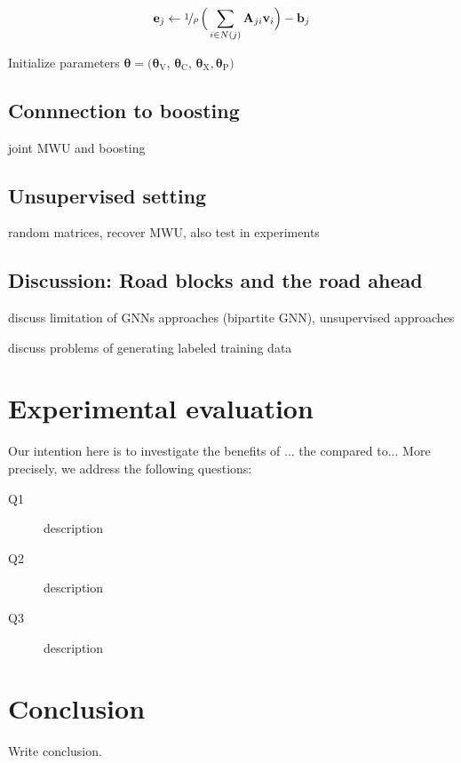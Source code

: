 \documentclass[11pt, DIV=12]{scrartcl}
\theoremstyle{definition}
\renewcommand{\vec}[1]{\mathbf{#1}}
\begin{document}
\begin{equation}\label{err}
\vec{e}_j \leftarrow \nicefrac{1}{\rho}\,\Big(\sum_{i \in N(j)} \vec{A}_{ji}  \vec{v}_i \Big) - \vec{b}_j   
\end{equation}

Initialize parameters $\boldsymbol{\theta} = (\boldsymbol{\theta}_{\text{V}}$, $\boldsymbol{\theta}_{\text{C}}$, $\boldsymbol{\theta}_{\text{X}}, \boldsymbol{\theta}_{\text{P}})$

\subsection{Connnection to boosting}

joint MWU and boosting


\subsection{Unsupervised setting}

random matrices, recover MWU, also test in experiments


\subsection{Discussion: Road blocks and the road ahead}
						
discuss limitation of GNNs approaches (bipartite GNN), unsupervised approaches

discuss problems of generating labeled training data

\section{Experimental evaluation}

Our intention here is to investigate the benefits of ... the compared to...
More precisely, we address the following questions:\\
\begin{description}
	\item[Q1] description
	\item[Q2] description
	\item[Q3] description
\end{description}

\section{Conclusion}
Write conclusion.			

 

	
\end{document}
